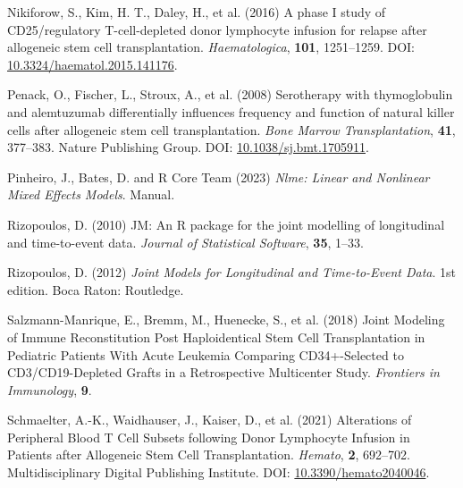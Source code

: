 \documentclass[
  letterpaper,
  DIV=11,
  numbers=noendperiod]{scrreprt}
\newlength{\cslhangindent}
\newlength{\cslentryspacingunit} %
\newenvironment{CSLReferences}[2] %
 {%
  \setlength{\parindent}{0pt}
  \ifodd #1
  \let\oldpar\par
  \def\par{\hangindent=\cslhangindent\oldpar}
  \fi
  \setlength{\parskip}{#2\cslentryspacingunit}
 }%
 {}
\begin{document}
\begin{CSLReferences}{1}{0}
\leavevmode{}%
Nikiforow, S., Kim, H. T., Daley, H., et al. (2016) A phase {I} study of
{CD25}/regulatory {T-cell-depleted} donor lymphocyte infusion for
relapse after allogeneic stem cell transplantation.
\emph{Haematologica}, \textbf{101}, 1251--1259. DOI:
\href{https://doi.org/10.3324/haematol.2015.141176}{10.3324/haematol.2015.141176}.

\leavevmode{}%
Penack, O., Fischer, L., Stroux, A., et al. (2008) Serotherapy with
thymoglobulin and alemtuzumab differentially influences frequency and
function of natural killer cells after allogeneic stem cell
transplantation. \emph{Bone Marrow Transplantation}, \textbf{41},
377--383. Nature Publishing Group. DOI:
\href{https://doi.org/10.1038/sj.bmt.1705911}{10.1038/sj.bmt.1705911}.

\leavevmode{}%
Pinheiro, J., Bates, D. and R Core Team (2023) \emph{Nlme: {Linear} and
Nonlinear Mixed Effects Models}. Manual.

\leavevmode{}%
Rizopoulos, D. (2010) {JM}: {An R} package for the joint modelling of
longitudinal and time-to-event data. \emph{Journal of Statistical
Software}, \textbf{35}, 1--33.

\leavevmode{}%
Rizopoulos, D. (2012) \emph{Joint {Models} for {Longitudinal} and
{Time-to-Event Data}}. 1st edition. Boca Raton: Routledge.

\leavevmode{}%
Salzmann-Manrique, E., Bremm, M., Huenecke, S., et al. (2018) Joint
{Modeling} of {Immune Reconstitution Post Haploidentical Stem Cell
Transplantation} in {Pediatric Patients With Acute Leukemia Comparing
CD34}+-{Selected} to {CD3}/{CD19-Depleted Grafts} in a {Retrospective
Multicenter Study}. \emph{Frontiers in Immunology}, \textbf{9}.

\leavevmode{}%
Schmaelter, A.-K., Waidhauser, J., Kaiser, D., et al. (2021) Alterations
of {Peripheral Blood T Cell Subsets} following {Donor Lymphocyte
Infusion} in {Patients} after {Allogeneic Stem Cell Transplantation}.
\emph{Hemato}, \textbf{2}, 692--702. Multidisciplinary Digital
Publishing Institute. DOI:
\href{https://doi.org/10.3390/hemato2040046}{10.3390/hemato2040046}.


\end{CSLReferences}
\end{document}
